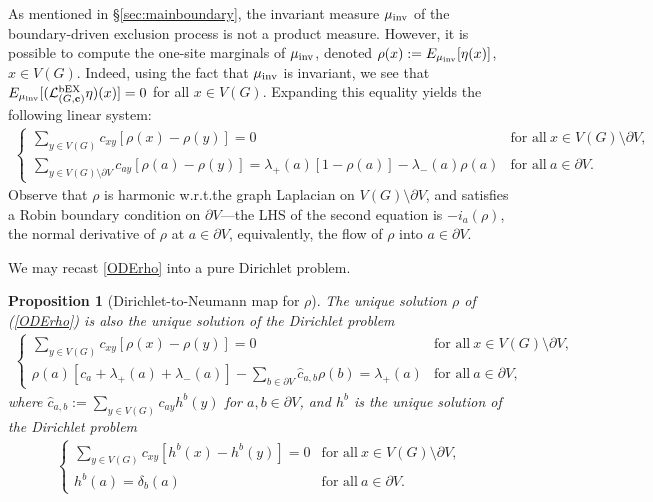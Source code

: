 \documentclass[11pt]{amsart}
\theoremstyle{plain}
\newtheorem{proposition}[lemma]{Proposition}
\theoremstyle{definition}
\theoremstyle{remark}
\begin{document}
As mentioned in \S\ref{sec:mainboundary}, the invariant measure $\mu_{\rm inv}$ of the boundary-driven exclusion process is not a product measure. However, it is possible to compute the one-site marginals of $\mu_{\rm inv}$, denoted $\rho(x) := E_{\mu_{\rm inv}}[\eta(x)]$, $x\in V(G)$. Indeed, using the fact that $\mu_{\rm inv}$ is invariant, we see that $E_{\mu_{\rm inv}}[(\mathcal{L}^{\rm bEX}_{(G,{\bf c})} \eta)(x)]=0$ for all $x\in V(G)$. Expanding this equality yields the following linear system:
\begin{align}
\label{ODErho}
\left\{
\begin{array}{ll}\displaystyle \sum_{y\in V(G)} c_{xy} [\rho(x) - \rho(y)]=0 &  \text{for all}~ x\in V(G)\setminus \partial V, \\ \displaystyle
\sum_{y\in V(G)\setminus \partial V} c_{ay} [\rho(a) - \rho(y)] = \lambda_+(a) [1-\rho(a)]  - \lambda_-(a) \rho(a) & \text{for all}~a \in \partial V.
   \end{array} \right.
\end{align}
Observe that $\rho$ is harmonic w.r.t.\@ the graph Laplacian on $V(G)\setminus \partial V$, and satisfies a Robin boundary condition on $\partial V$---the LHS of the second equation is $-i_a(\rho)$, the normal derivative of $\rho$ at $a\in \partial V$, equivalently, the flow of $\rho$ into $a\in \partial V$. 

We may recast \eqref{ODErho} into a pure Dirichlet problem.

\begin{proposition}[Dirichlet-to-Neumann map for $\rho$]
\label{prop:DtoN}
The unique solution $\rho$ of (\ref{ODErho}) is also the unique solution of the Dirichlet problem
\begin{align}
\label{ODErho2}
\left\{
\begin{array}{ll}\displaystyle \sum_{y\in V(G)} c_{xy} [\rho(x) - \rho(y)]=0 &  \text{for all}~ x\in V(G)\setminus \partial V,\\
\displaystyle \rho(a)\left[c_a+\lambda_+(a)+\lambda_-(a) \right] - \sum_{b\in \partial V} \hat{c}_{a,b} \rho(b) = \lambda_+(a) & \text{for all}~a \in \partial V,
   \end{array} \right.
\end{align}
where $\hat{c}_{a,b} := \sum_{y\in V(G)} c_{ay} h^b(y)$ for $a,b\in \partial V$, and $h^b$ is the unique solution of the Dirichlet problem
\begin{align}
\label{ODErho3}
\left\{
\begin{array}{ll}\displaystyle \sum_{y\in V(G)} c_{xy} [h^b(x) - h^b(y)]=0 &  \text{for all}~ x\in V(G)\setminus\partial V,\\
h^b(a) = \delta_b(a) & \text{for all}~a \in \partial V.
   \end{array} \right.
\end{align}
\end{proposition}
\end{document}
